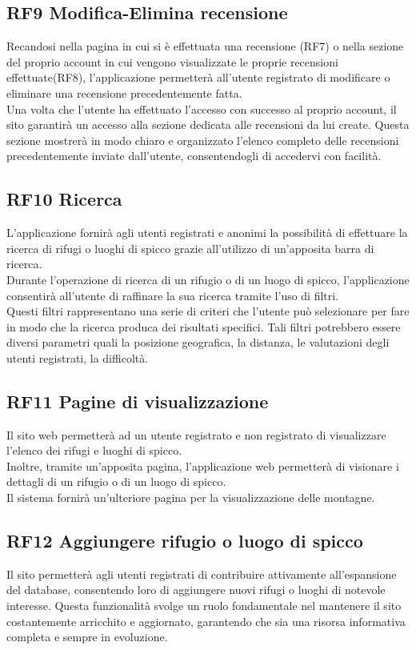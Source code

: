 \documentclass[a4paper,12pt]{article}
\begin{document}
\subsection*{RF9 Modifica-Elimina recensione}
Recandosi nella pagina in cui si è effettuata una recensione (RF7) o nella sezione del proprio account in cui vengono visualizzate le proprie recensioni effettuate(RF8), l'applicazione permetterà all'utente registrato di modificare o eliminare una recensione precedentemente fatta.\\
Una volta che l'utente ha effettuato l'accesso con successo al proprio account, il sito garantirà un accesso alla sezione dedicata alle recensioni da lui create. Questa sezione mostrerà in modo chiaro e organizzato l'elenco completo delle recensioni precedentemente inviate dall'utente, consentendogli di accedervi con facilità.


\subsection*{RF10 Ricerca}
L'applicazione fornirà agli utenti registrati e anonimi la possibilità di effettuare la ricerca di rifugi o luoghi di spicco grazie all’utilizzo di un’apposita barra di ricerca.\\
Durante l'operazione di ricerca di un rifugio o di un luogo di spicco, l'applicazione consentirà all'utente di raffinare la sua ricerca tramite l'uso di filtri.\\
Questi filtri rappresentano una serie di criteri che l'utente può selezionare per fare in modo che la ricerca produca dei risultati specifici.
Tali filtri potrebbero essere diversi parametri quali la posizione geografica, la distanza, le valutazioni degli utenti registrati, la difficoltà.


\subsection*{RF11 Pagine di visualizzazione}
Il sito web permetterà ad un utente registrato e non registrato di visualizzare l'elenco dei rifugi e luoghi di spicco.\\
Inoltre, tramite un'apposita pagina, l'applicazione web permetterà di visionare i dettagli di un rifugio o di un luogo di spicco.\\
Il sistema fornirà un'ulteriore pagina per la visualizzazione delle montagne.


\subsection*{RF12 Aggiungere rifugio o luogo di spicco}
Il sito permetterà agli utenti registrati di contribuire attivamente all'espansione del database, consentendo loro di aggiungere nuovi rifugi o luoghi di notevole interesse. Questa funzionalità svolge un ruolo fondamentale nel mantenere il sito costantemente arricchito e aggiornato, garantendo che sia una risorsa informativa completa e sempre in evoluzione.
\end{document}
